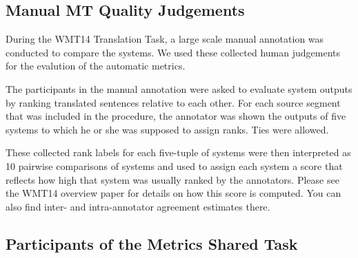 \subsection{Manual MT Quality Judgements}

During the WMT14 Translation Task, a large scale manual annotation was conducted
to compare the systems. We used these collected human judgements for the evalution
of
the automatic metrics. 

The participants in the manual annotation were asked to evaluate system outputs
by ranking translated sentences relative to each other. For each source segment
that was included in the procedure, the annotator was shown the outputs of five
systems to which he or she was supposed to assign ranks. Ties were allowed.

These collected rank labels for each five-tuple of systems were then interpreted
as 10 pairwise comparisons of systems and  used to assign each system a score
that
reflects how high that system was usually ranked by the annotators. Please see
the WMT14 overview paper for details on how this score is computed. You
can also find inter- and intra-annotator agreement estimates there.


\subsection{Participants of the Metrics Shared Task}

